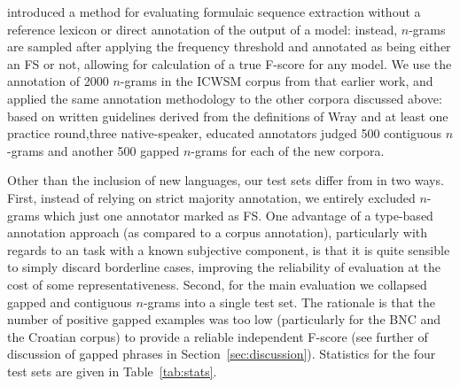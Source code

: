 \documentclass[11pt,letterpaper]{article}
\newcommand{\tabref}[2][]{Table#1~\ref{#2}\xspace}
\newcommand{\secref}[2][]{Section#1~\ref{#2}\xspace}
\begin{document}
 introduced a method for evaluating formulaic sequence extraction without a reference lexicon or direct annotation of the output of a model: instead, $n$-grams are sampled after applying the frequency threshold and annotated as being either an FS or not, allowing for calculation of a true F-score for any model. We use the annotation of 2000 $n$-grams in the ICWSM corpus from that earlier work, and applied the same annotation methodology to the other corpora discussed above: based on written guidelines derived from the definitions of Wray \cite{Wray08} and at least one practice round,three native-speaker, educated annotators judged 500 contiguous $n$-grams and another 500 gapped $n$-grams for each of the new corpora. 

Other than the inclusion of new languages, our test sets differ from  in two ways. First, instead of relying on strict majority annotation, we entirely excluded $n$-grams which just one annotator marked as FS. One advantage of a type-based annotation approach (as compared to a corpus annotation), particularly with regards to an task with a known subjective component, is that it is quite sensible to simply discard borderline cases, improving the reliability of evaluation at the cost of some representativeness.  Second, for the main evaluation we collapsed gapped and contiguous $n$-grams into a single test set. The rationale is that the number of positive gapped examples was too low (particularly for the BNC and the Croatian corpus) to provide a reliable independent F-score (see further of discussion of gapped phrases in \secref{sec:discussion}). Statistics for the four test sets are given in \tabref{tab:stats}.
\end{document}
